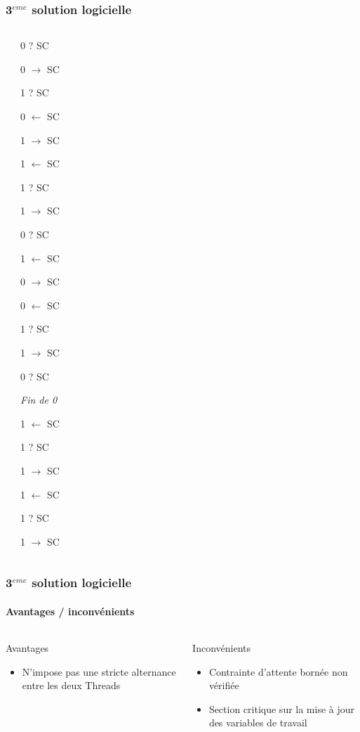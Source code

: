 \begin{frame}
\frametitle{3$^{eme}$ solution logicielle}
\begin{columns}
\begin{scriptsize}\end{scriptsize}
\begin{itemize}
\begin{tiny}
\item 0 ? SC
\item 0 $\rightarrow$ SC
\item 1 ? SC
\item 0 $\leftarrow$ SC
\item 1 $\rightarrow$ SC
\item 1 $\leftarrow$ SC
\item 1 ? SC
\item 1 $\rightarrow$ SC
\item 0 ? SC
\item 1 $\leftarrow$ SC
\item 0 $\rightarrow$ SC
\item 0 $\leftarrow$ SC
\item 1 ? SC
\item 1 $\rightarrow$ SC
\item 0 ? SC
\item \textit{Fin de 0}
\item 1 $\leftarrow$ SC
\item 1 ? SC
\item 1 $\rightarrow$ SC
\item 1 $\leftarrow$ SC
\item 1 ? SC
\item 1 $\rightarrow$ SC
\end{tiny}
\end{itemize}
\end{columns}
\end{frame}

\begin{frame}
\frametitle{3$^{eme}$ solution logicielle}
\framesubtitle{Avantages / inconvénients}

\begin{columns}
\begin{block}{Avantages}
\begin{itemize}
\item N’impose pas une stricte alternance entre les deux Threads
\end{itemize}
\end{block}
\begin{block}{Inconvénients}
\begin{itemize}
\item Contrainte d'attente bornée non vérifiée
\item Section critique sur la mise à jour des variables de travail
\end{itemize}
\end{block}
\end{columns}
\end{frame}

